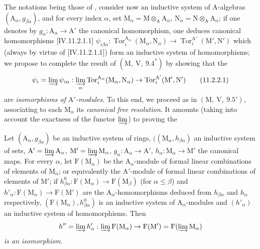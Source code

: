 \begin{env}[11.2.2]
\label{IV.11.2.2}
The notations being those of , consider now an inductive system of A-algebras $(\mathrm{A}_\alpha,g_{\beta\alpha})$, and for every index $\alpha$, set $\mathrm{M}_\alpha=\mathrm{M}\otimes_\mathrm{A}\mathrm{A}_\alpha$, $\mathrm{N}_\alpha=\mathrm{N}\otimes_\mathrm{A}\mathrm{A}_\alpha$; if one denotes by $g_\alpha:\mathrm{A}_\alpha\to\mathrm{A}'$ the canonical homomorphism, one deduces canonical homomorphisms [IV.11.2.1.1] $\psi_{i\beta\alpha}:\operatorname{Tor}_i^{\mathrm{A}_\alpha}(\mathrm{M}_\alpha,\mathrm{N}_\alpha)\to\operatorname{Tor}_i^{\mathrm{A}'}(\mathrm{M}',\mathrm{N}')$ which (always by virtue of [IV.11.2.1.1]) form an inductive system of homomorphisms; we propose to complete the result of $(\mathrm{M},~\mathrm{V},~9.4^*)$ by showing that the
\begin{equation}
  \psi_i=\varinjlim\psi_{i\alpha}:\varinjlim_\alpha\operatorname{Tor}_i^{\mathrm{A}_\alpha}(\mathrm{M}_\alpha,\mathrm{N}_\alpha)\to\operatorname{Tor}_i^{\mathrm{A}'}(\mathrm{M}',\mathrm{N}')
  \tag{11.2.2.1}
\end{equation}
are \emph{isomorphisms of $\mathrm{A}'$-modules}. To this end, we proceed as in $(\mathrm{M},~\mathrm{V},~9.5')$, associating to each $\mathrm{M}_\alpha$ its \emph{canonical free resolution}. It amounts (taking into account the exactness of the functor $\varinjlim$) to proving the
\end{env}


\begin{lemma}[11.2.2.2]
\label{IV.11.2.2.2}
Let $(\mathrm{A}_\alpha,g_{\beta\alpha})$ be an inductive system of rings, $((\mathrm{M}_\alpha,h_{\beta\alpha})$ an inductive system of sets, $\mathrm{A}'=\varinjlim\mathrm{A}_\alpha$, $\mathrm{M}'=\varinjlim\mathrm{M}_\alpha$, $g_\alpha:\mathrm{A}_\alpha\to\mathrm{A}'$, $h_\alpha:\mathrm{M}_\alpha\to\mathrm{M}'$ the canonical maps. For every $\alpha$, let $\mathrm{F}(\mathrm{M}_\alpha)$ be the $\mathrm{A}_\alpha$-module of formal linear combinations of elements of $\mathrm{M}_\alpha$; or equivalently the $\mathrm{A}'$-module of formal linear combinations of elements of $\mathrm{M}'$; if $h_{\beta\alpha}^0:\mathrm{F}(\mathrm{M}_\alpha)\to\mathrm{F}(\mathrm{M}_\beta)$ (for $\alpha\leqslant\beta$) and $h'_\alpha:\mathrm{F}(\mathrm{M}_\alpha)\to\mathrm{F}(\mathrm{M}')$ are the $\mathrm{A}_\alpha$-homomorphisms deduced from $h_{\beta\alpha}$ and $h_\alpha$ respectively, $(\mathrm{F}(\mathrm{M}_\alpha),h^0_{\beta\alpha})$ is an inductive system of $\mathrm{A}_\alpha$-modules and $(h'_\alpha)$ an inductive system of homomorphisms. Then
\[
  h''=\varinjlim h'_\alpha:\varinjlim\mathrm{F}(\mathrm{M}_\alpha)\to\mathrm{F}(\mathrm{M}')=\mathrm{F}(\varinjlim\mathrm{M}_\alpha)
\]
\emph{is an isomorphism.}
\end{lemma}

